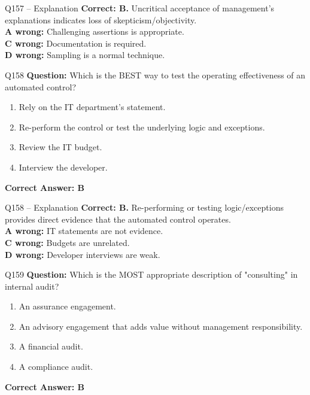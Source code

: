 \documentclass[aspectratio=169,10pt]{beamer}
\begin{document}
	\begin{frame}[t]{Q157 -- Explanation}
		\small
		\textbf{Correct: B.} Uncritical acceptance of management's explanations indicates loss of skepticism/objectivity. \\[4pt]
		\textbf{A wrong:} Challenging assertions is appropriate. \\[2pt]
		\textbf{C wrong:} Documentation is required. \\[2pt]
		\textbf{D wrong:} Sampling is a normal technique.
	\end{frame}
	
	\begin{frame}[t]{Q158}
		\small
		\textbf{Question:} Which is the BEST way to test the operating effectiveness of an automated control?
		\begin{enumerate}[label=\Alph*.,itemsep=1pt,topsep=2pt]
			\item Rely on the IT department's statement.
			\item Re-perform the control or test the underlying logic and exceptions.
			\item Review the IT budget.
			\item Interview the developer.
		\end{enumerate}
		\vspace{4pt}
		\textbf{Correct Answer: B}
	\end{frame}
	
	\begin{frame}[t]{Q158 -- Explanation}
		\small
		\textbf{Correct: B.} Re-performing or testing logic/exceptions provides direct evidence that the automated control operates. \\[4pt]
		\textbf{A wrong:} IT statements are not evidence. \\[2pt]
		\textbf{C wrong:} Budgets are unrelated. \\[2pt]
		\textbf{D wrong:} Developer interviews are weak.
	\end{frame}
	
	\begin{frame}[t]{Q159}
		\small
		\textbf{Question:} Which is the MOST appropriate description of "consulting" in internal audit?
		\begin{enumerate}[label=\Alph*.,itemsep=1pt,topsep=2pt]
			\item An assurance engagement.
			\item An advisory engagement that adds value without management responsibility.
			\item A financial audit.
			\item A compliance audit.
		\end{enumerate}
		\vspace{4pt}
		\textbf{Correct Answer: B}
	\end{frame}
	
\end{document}
